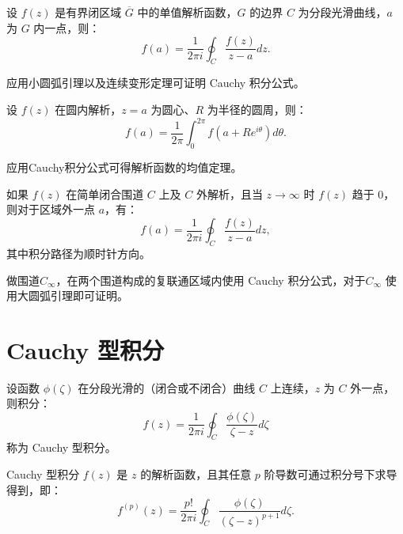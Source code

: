 \begin{theorem}
设 \(f(z)\) 是有界闭区域 \(\overline{G}\) 中的单值解析函数，\(G\) 的边界 \(C\) 为分段光滑曲线，\(a\) 为 \(G\) 内一点，则：
\[
f(a) = \frac{1}{2\pi i} \oint_C \frac{f(z)}{z - a} dz.
\]
\end{theorem}

\begin{remark}
    应用小圆弧引理以及连续变形定理可证明 Cauchy 积分公式。
\end{remark}

\begin{theorem}[解析函数的均值定理]
设 \(f(z)\) 在圆内解析，\(z=a\) 为圆心、\(R\) 为半径的圆周，则：
\[
f(a) = \frac{1}{2\pi} \int_0^{2\pi} f(a + R e^{i\theta}) d\theta.
\]
\end{theorem}

\begin{remark}
    应用Cauchy积分公式可得解析函数的均值定理。
\end{remark}

\begin{theorem}
如果 \(f(z)\) 在简单闭合围道 \(C\) 上及 \(C\) 外解析，且当 \(z \to \infty\) 时 \(f(z)\) 趋于 \(0\)，则对于区域外一点 \(a\)，有：
\[
f(a) = \frac{1}{2\pi i} \oint_C \frac{f(z)}{z-a} dz,
\]
其中积分路径为顺时针方向。
\end{theorem}

\begin{remark}
    做围道$C_{\infty}$，在两个围道构成的复联通区域内使用 Cauchy 积分公式，对于$C_{\infty}$
    使用大圆弧引理即可证明。
\end{remark}


\section{Cauchy 型积分}

\begin{definition}
设函数 \(\phi(\zeta)\) 在分段光滑的（闭合或不闭合）曲线 \(C\) 上连续，\(z\) 为 \(C\) 外一点，则积分：
\[
f(z) = \frac{1}{2\pi i} \oint_C \frac{\phi(\zeta)}{\zeta - z} d\zeta
\]
称为 Cauchy 型积分。
\end{definition}

\begin{theorem}
Cauchy 型积分 \(f(z)\) 是 \(z\) 的解析函数，且其任意 \(p\) 阶导数可通过积分号下求导得到，即：
\[
f^{(p)}(z) = \frac{p!}{2\pi i} \oint_C \frac{\phi(\zeta)}{(\zeta - z)^{p+1}} d\zeta.
\]
\end{theorem}


